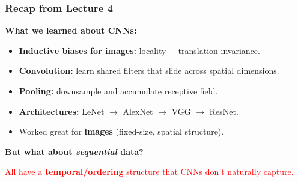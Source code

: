 \documentclass[notes,11pt, aspectratio=169]{beamer}
\begin{document}
\begin{frame}
\frametitle{Recap from Lecture 4}

\textbf{What we learned about CNNs:}
\begin{itemize}
    \item \textbf{Inductive biases for images:} locality + translation invariance.
    \item \textbf{Convolution:} learn shared filters that slide across spatial dimensions.
    \item \textbf{Pooling:} downsample and accumulate receptive field.
    \item \textbf{Architectures:} LeNet $\to$ AlexNet $\to$ VGG $\to$ ResNet.
    \item Worked great for \textbf{images} (fixed-size, spatial structure).
\end{itemize}

\vspace{8pt}
\textbf{But what about \emph{sequential} data?}
\begin{center}
\end{center}

\textcolor{red}{All have a \textbf{temporal/ordering} structure that CNNs don't naturally capture.}
\end{frame}
\end{document}
